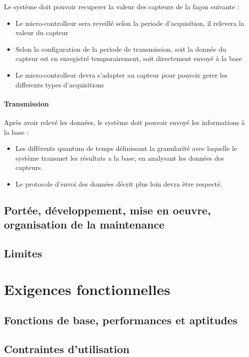  Le système doit pouvoir recuperer la valeur des capteurs de la façon suivante :

\begin{itemize}
\item Le micro-controlleur sera reveillé selon la periode d'acquisition, il relevera la valeur du capteur 
\item Selon la configuration de la periode de transmission, soit la donnée du capteur est en enregistré temporairement, soit directement envoyé à la base
\item Le micro-controlleur devra s'adapter au capteur pour pouvoir gerer les differents types d'acquisitions
\end{itemize}

\paragraph{Transmission} Après avoir relevé les données, le système doit pouvoir envoyé les informations à la base :

\begin{itemize}
\item Les différents quantum de temps définissant la granularité avec laquelle le système transmet les résultats a la base, en analysant les données des capteurs.
\item Le protocole d'envoi des données décrit plus loin devra être respecté. 
\end{itemize}

\subsection{Portée, développement, mise en oeuvre, organisation de la maintenance}


\subsection{Limites}

\section{Exigences fonctionnelles}
\subsection{Fonctions de base, performances et aptitudes}
\subsection{Contraintes d'utilisation}

